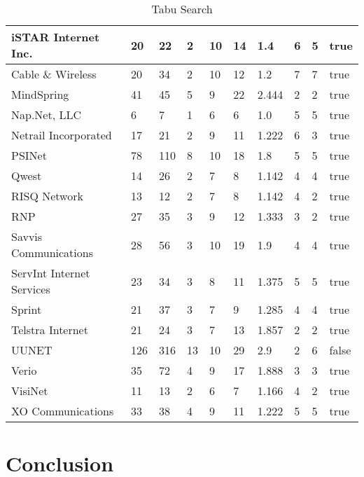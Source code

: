 \documentclass [12pt]{article}
\begin{document}
\begin{table}[H]
\begin{tabular}{ | l | l | l | l | l | l | l | l | l | l |  }
    iSTAR Internet Inc. & 20 & 22 & 2 & 10 & 14 & 1.4 & 6 & 5 & true\\ \hline
    Cable \& Wireless & 20 & 34 & 2 & 10 & 12 & 1.2 & 7 & 7 & true\\ \hline
    MindSpring & 41 & 45 & 5 & 9 & 22 & 2.444 & 2 & 2 & true\\ \hline
    Nap.Net, LLC & 6 & 7 & 1 & 6 & 6 & 1.0 & 5 & 5 & true\\ \hline
    Netrail Incorporated & 17 & 21 & 2 & 9 & 11 & 1.222 & 6 & 3 & true\\ \hline
    PSINet & 78 & 110 & 8 & 10 & 18 & 1.8 & 5 & 5 & true\\ \hline
    Qwest & 14 & 26 & 2 & 7 & 8 & 1.142 & 4 & 4 & true\\ \hline
    RISQ Network & 13 & 12 & 2 & 7 & 8 & 1.142 & 4 & 2 & true\\ \hline
    RNP & 27 & 35 & 3 & 9 & 12 & 1.333 & 3 & 2 & true\\ \hline
    Savvis Communications & 28 & 56 & 3 & 10 & 19 & 1.9 & 4 & 4 & true\\ \hline
    ServInt Internet Services & 23 & 34 & 3 & 8 & 11 & 1.375 & 5 & 5 & true\\ \hline
    Sprint & 21 & 37 & 3 & 7 & 9 & 1.285 & 4 & 4 & true\\ \hline
    Telstra Internet & 21 & 24 & 3 & 7 & 13 & 1.857 & 2 & 2 & true\\ \hline
    UUNET & 126 & 316 & 13 & 10 & 29 & 2.9 & 2 & 6 & false\\ \hline
    Verio & 35 & 72 & 4 & 9 & 17 & 1.888 & 3 & 3 & true\\ \hline
    VisiNet & 11 & 13 & 2 & 6 & 7 & 1.166 & 4 & 2 & true\\ \hline
    XO Communications & 33 & 38 & 4 & 9 & 11 & 1.222 & 5 & 5 & true\\ \hline
  \end{tabular}
  \caption{Tabu Search}
\end{table}

\section{Conclusion}


\end{document}

